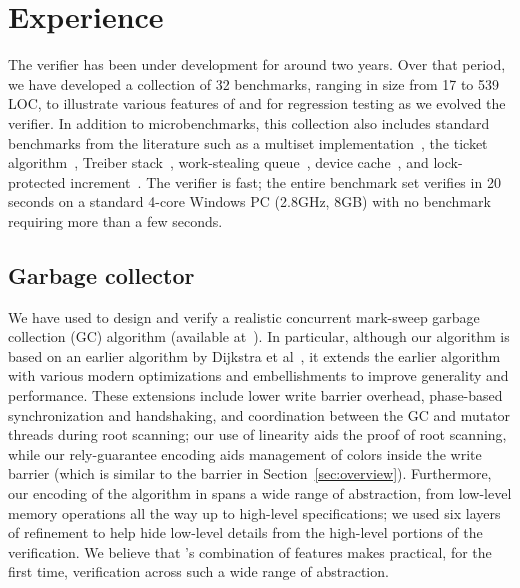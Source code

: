 \section{Experience}
\label{sec:experience}

The \civl verifier has been under development for around two years.  
Over that period, we have developed a collection of 32 benchmarks, 
ranging in size from 17 to 539 LOC, to illustrate various features of
\civl and for regression testing as we evolved the verifier.
In addition to microbenchmarks, this collection also includes
standard benchmarks from the literature such as a multiset implementation~\cite{ElmasTQ05}, 
the ticket algorithm~\cite{FarzanKP14}, 
Treiber stack~\cite{Herlihy2008}, work-stealing queue~\cite{Blumofe1999},
device cache~\cite{ElmasQT09}, and lock-protected increment~\cite{FlanaganQ03}. 
The \civl verifier is fast; the entire benchmark set verifies in 20 seconds on a standard 4-core Windows PC (2.8GHz, 8GB)
with no benchmark requiring more than a few seconds.

\subsection{Garbage collector}
We have used \civl to design and verify a realistic concurrent mark-sweep garbage collection (GC) algorithm (available at~\cite{GC}).  
In particular, although our algorithm is based on an earlier algorithm by Dijkstra et al~\cite{dijk78}, 
it extends the earlier algorithm with various modern optimizations and embellishments to improve generality and performance.  
These extensions include lower write barrier overhead, phase-based synchronization and handshaking, 
and coordination between the GC and mutator threads during root scanning; our use of linearity aids the proof of root scanning, 
while our rely-guarantee encoding aids management of colors inside the write barrier
(which is similar to the barrier in Section~\ref{sec:overview}).
Furthermore, our encoding of the algorithm in \civl spans a wide range of abstraction, 
from low-level memory operations all the way up to high-level specifications; 
we used six layers of refinement to help hide low-level details from the high-level portions of the verification.
We believe that \civl's combination of features makes practical, for the first time, verification across such a wide range of abstraction.


